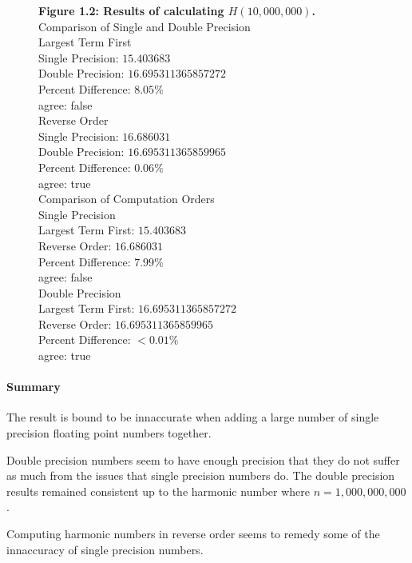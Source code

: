 \documentclass[12pt]{article}
\begin{document}
\begin{figure}[h]
	\textbf{Figure 1.2: Results of calculating $H(10,000,000)$.}\\
	
	Comparison of Single and Double Precision\\
	Largest Term First\\
	Single Precision: $15.403683$\\
	Double Precision: $16.695311365857272$\\
	Percent Difference: $8.05\%$\\
	agree: false\\
	
	Reverse Order\\
	Single Precision: $16.686031$\\
	Double Precision: $16.695311365859965$\\
	Percent Difference: $0.06\%$\\
	agree: true\\
	
	Comparison of Computation Orders\\
	Single Precision\\
	Largest Term First: $15.403683$\\
	Reverse Order: $16.686031$\\
	Percent Difference: $7.99\%$\\
	agree: false\\
	
	Double Precision\\
	Largest Term First: $16.695311365857272$\\
	Reverse Order: $16.695311365859965$\\
	Percent Difference: $< 0.01\%$\\
	agree: true
\end{figure}

\paragraph{Summary}
The result is bound to be innaccurate when adding a large number of single precision floating point numbers together.

Double precision numbers seem to have enough precision that they do not suffer as much from the issues that single precision numbers do. The double precision results remained consistent up to the harmonic number where $n=1,000,000,000$.

Computing harmonic numbers in reverse order seems to remedy some of the innaccuracy of single precision numbers.
\end{document}
